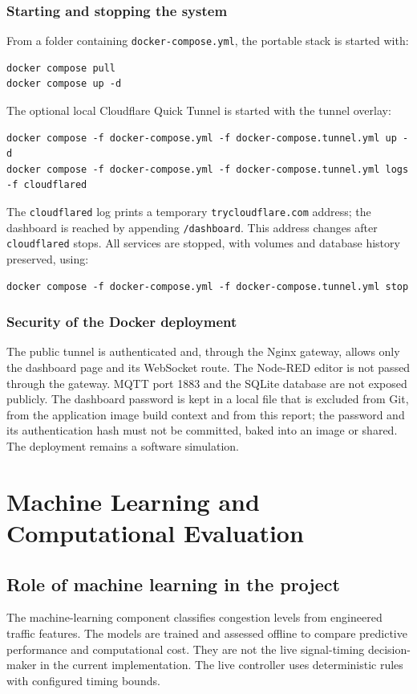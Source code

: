 \documentclass[12pt,a4paper,oneside]{report}
\begin{document}
\subsection{Starting and stopping the system}
From a folder containing \texttt{docker-compose.yml}, the portable stack is started with:
{\small
\begin{verbatim}
docker compose pull
docker compose up -d
\end{verbatim}}
The optional local Cloudflare Quick Tunnel is started with the tunnel overlay:
{\scriptsize
\begin{verbatim}
docker compose -f docker-compose.yml -f docker-compose.tunnel.yml up -d
docker compose -f docker-compose.yml -f docker-compose.tunnel.yml logs -f cloudflared
\end{verbatim}}
The \texttt{cloudflared} log prints a temporary \texttt{trycloudflare.com} address; the dashboard is reached by appending \texttt{/dashboard}. This address changes after \texttt{cloudflared} stops. All services are stopped, with volumes and database history preserved, using:
{\scriptsize
\begin{verbatim}
docker compose -f docker-compose.yml -f docker-compose.tunnel.yml stop
\end{verbatim}}

\subsection{Security of the Docker deployment}
The public tunnel is authenticated and, through the Nginx gateway, allows only the dashboard page and its WebSocket route. The Node-RED editor is not passed through the gateway. MQTT port 1883 and the SQLite database are not exposed publicly. The dashboard password is kept in a local file that is excluded from Git, from the application image build context and from this report; the password and its authentication hash must not be committed, baked into an image or shared. The deployment remains a software simulation.

\clearpage
\chapter{Machine Learning and Computational Evaluation}
\section{Role of machine learning in the project}
The machine-learning component classifies congestion levels from engineered traffic features. The models are trained and assessed offline to compare predictive performance and computational cost. They are not the live signal-timing decision-maker in the current implementation. The live controller uses deterministic rules with configured timing bounds.
\end{document}
